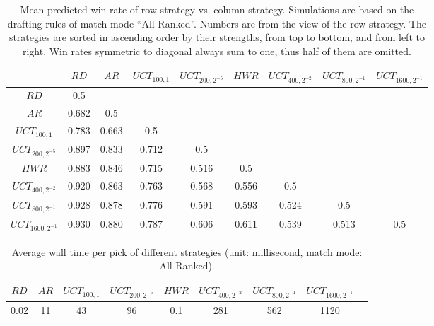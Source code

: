 \begin{table}
  \caption{Mean predicted win rate of row strategy  vs. column strategy. Simulations are based on the drafting rules of match mode ``All Ranked''. Numbers are from the view of the row strategy. The strategies are sorted in ascending order by their strengths, from top to bottom, and from left to right. Win rates symmetric to diagonal always sum to one, thus half of them are omitted.}
  \label{tab:mcts}
  \centering
  \begin{tabular}{ccccccccc}
    \toprule
      & $RD$ & $AR$ & $UCT_{100, 1}$ & $UCT_{200, 2^{-5}}$ & $HWR$  & $UCT_{400, 2^{-2}}$ & $UCT_{800, 2^{-1}}$ & $UCT_{1600, 2^{-1}}$ \\
    \midrule
    $RD$ & 0.5 &  &  &  &  &  &  &  \\
    $AR$ & 0.682 & 0.5 &  &  &  &  &  & \\
    $UCT_{100, 1}$ & 0.783 & 0.663 & 0.5 & & &  &  \\
    $UCT_{200, 2^{-5}}$ & 0.897 & 0.833 & 0.712 & 0.5 & & & \\
    $HWR$ & 0.883 & 0.846 & 0.715 & 0.516 & 0.5 \\
    $UCT_{400, 2^{-2}}$ & 0.920 & 0.863 & 0.763 & 0.568 & 0.556 & 0.5   \\
    $UCT_{800, 2^{-1}}$ & 0.928 & 0.878  & 0.776 &  0.591 & 0.593 & 0.524 & 0.5 &  \\
$UCT_{1600, 2^{-1}}$ & 0.930 & 0.880  & 0.787 & 0.606 & 0.611 & 0.539 & 0.513 & 0.5 \\
  \bottomrule
\end{tabular}
\end{table}

\begin{table}
  \caption{Average wall time per pick of different strategies (unit: millisecond, match mode: All Ranked).}
  \label{tab:mcts_time}
  \centering
  \begin{tabular}{ccccccccc}
    \toprule
      $RD$ & $AR$ & $UCT_{100, 1}$ & $UCT_{200, 2^{-5}}$ & $HWR$  & $UCT_{400, 2^{-2}}$ & $UCT_{800, 2^{-1}}$ & $UCT_{1600, 2^{-1}}$ \\
    \midrule
     0.02 & 11 & 43 & 96 & 0.1 & 281 & 562 & 1120 \\
    \bottomrule
\end{tabular}
\end{table}

